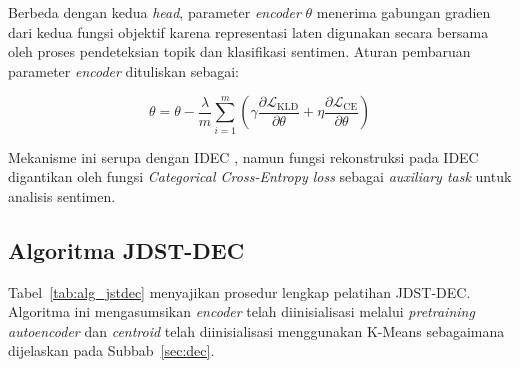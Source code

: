 Berbeda dengan kedua \textit{head}, parameter \textit{encoder}
$\theta$ menerima gabungan gradien dari kedua fungsi objektif karena
representasi laten digunakan secara bersama oleh proses
pendeteksian topik dan klasifikasi sentimen. Aturan pembaruan parameter \textit{encoder}
dituliskan sebagai:

\begin{equation}
    \theta
    =
    \theta
    -
    \frac{\lambda}{m}
    \sum_{i=1}^{m}
    \left(
        \gamma
        \frac{\partial \mathcal{L}_{\text{KLD}}}{\partial \theta}
        +
        \eta
        \frac{\partial \mathcal{L}_{\text{CE}}}{\partial \theta}
    \right)
    \label{eq:update_encoder}
\end{equation}

Mekanisme ini serupa dengan IDEC \parencite{guo2017improved}, namun
fungsi rekonstruksi pada IDEC digantikan oleh
fungsi \textit{Categorical Cross-Entropy loss} sebagai
\textit{auxiliary task} untuk analisis sentimen.

\subsection{Algoritma JDST-DEC}

Tabel~\ref{tab:alg_jstdec} menyajikan prosedur lengkap pelatihan
JDST-DEC. Algoritma ini mengasumsikan \textit{encoder} telah
diinisialisasi melalui \textit{pretraining autoencoder} dan
\textit{centroid} telah diinisialisasi menggunakan K-Means sebagaimana
dijelaskan pada Subbab~\ref{sec:dec}.

